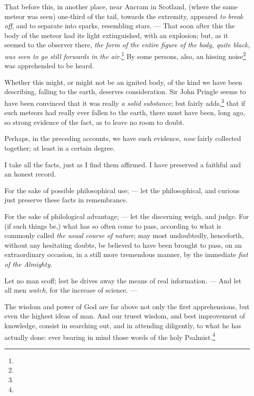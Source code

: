 \documentclass[a4paper, 12pt, oneside]{article}
\begin{document}
That before this, in another place, near Ancram in Scotland, (where the same meteor was seen) one-third of the tail, towards the extremity, appeared \emph{to break off}, and to separate into sparks, resembling stars. --- That soon after this the body of the meteor had its light extinguished, with an explosion; but, as it seemed to the observer there, \emph{the form of the entire figure of the body, quite black, was seen to go still forwards in the air}.\footnote{} By some persons, also, an hissing noise\footnote{} was apprehended to be heard.

Whether this might, or might not be an ignited body, of the kind we have been describing, falling to the earth, deserves consideration. Sir John Pringle seems to have been convinced that it was really \emph{a solid substance}; but fairly adds,\footnote{} that if such meteors had really ever fallen to the earth, there must have been, long ago, so strong evidence of the fact, as to leave no room to doubt.

Perhaps, in the preceding accounts, we have such evidence, \emph{now} fairly collected together; at least in a certain degree.

I take all the facts, just as I find them affirmed. I have preserved a faithful and an honest record.

For the sake of possible philosophical use; --- let the philosophical, and curious just preserve these facts in remembrance.

For the sake of philological advantage; --- let the discerning weigh, and judge. For (if such things be,) what has so often come to pass, according to what is commonly called \emph{the usual course of nature}; may most undoubtedly, henceforth, without any hesitating doubts, be believed to have been brought to pass, on an extraordinary occasion, in a still more tremendous manner, by the immediate \emph{fiat of the Almighty}.

Let no man scoff; lest he drives away the means of real information. --- And let all men \emph{watch}, for the increase of science. ---

The wisdom and power of God are far above not only the first apprehensions, but even the highest ideas of man. And our truest wisdom, and best improvement of knowledge, consist in searching out, and in attending diligently, to what he has actually done: ever bearing in mind those words of the holy Psalmist.\footnote{}
\end{document}
